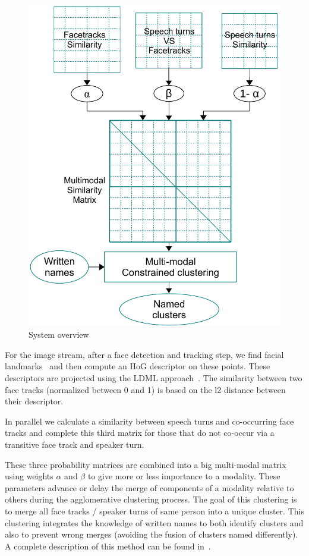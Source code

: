 \documentclass{acm_proc_article-me}
\begin{document}
\begin{figure}[htb]
 \centering
 \includegraphics[width=0.9\linewidth]{figs/schema_clus_contraint.pdf}
 \caption {System overview}
 \label{fig:gene}
\end{figure}

For the image stream, after a face detection and tracking step, we find facial landmarks~\cite{URICAR--VISAPP--2012} and then compute an HoG descriptor on these points. These descriptors are projected using the LDML approach~\cite{GUILLAUMIN--IJCV--2012}. The similarity between two face tracks (normalized between 0 and 1) is based on the l2 distance between their descriptor.

In parallel we calculate a similarity between speech turns and co-occurring face tracks and complete this third matrix for those that do not co-occur via a transitive face track and speaker turn.

These three probability matrices are combined into a big multi-modal matrix using weights $\alpha$ and $\beta$ to give more or less importance to a modality. These parameters advance or delay the merge of components of a modality relative to others during the agglomerative clustering process. The goal of this clustering is to merge all face tracks / speaker turns of same person into a unique cluster. This clustering integrates the knowledge of written names to both identify clusters and also to prevent wrong merges (avoiding the fusion of clusters named differently). A complete description of this method can be found in~\cite{POIGNANT--MTAP--2015}.
\end{document}
